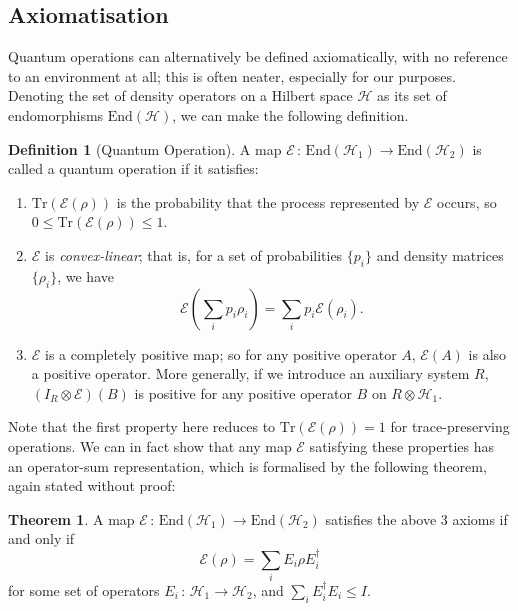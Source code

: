 \documentclass[12pt,a4paper]{report}
\numberwithin{equation}{section}
\newcommand{\tr}{\text{Tr}}
\theoremstyle{definition}
\newtheorem{definition}{Definition}[section]
\theoremstyle{theorem}
\newtheorem{theorem}{Theorem}[section]
\theoremstyle{theorem}
\theoremstyle{example}
\theoremstyle{definition}
\begin{document}
\subsection{Axiomatisation}
Quantum operations can alternatively be defined axiomatically, with no reference to an environment at all; this is often neater, especially for our purposes. Denoting the set of density operators on a Hilbert space $\mathcal{H}$ as its set of endomorphisms $\text{End}(\mathcal{H})$, we can make the following definition.
\begin{definition}[Quantum Operation]
	A map $\mathcal{E}\,:\,\text{End}(\mathcal{H}_{1})\to\text{End}(\mathcal{H}_{2})$ is called a quantum operation if it satisfies:
	\begin{enumerate}
		\item $\text{Tr}(\mathcal{E}(\rho))$ is the probability that the process represented by $\mathcal{E}$ occurs, so $0\leq\text{Tr}(\mathcal{E}(\rho))\leq 1$.
		\item $\mathcal{E}$ is \textit{convex-linear}; that is, for a set of probabilities $\{p_{i}\}$ and density matrices $\{\rho_{i}\}$, we have
		\begin{equation}
			\mathcal{E}\left(\sum_{i}p_{i}\rho_{i}\right)=\sum_{i}p_{i}\mathcal{E}(\rho_{i}).
		\end{equation}
		\item $\mathcal{E}$ is a completely positive map; so for any positive operator $A$, $\mathcal{E}(A)$ is also a positive operator. More generally, if we introduce an auxiliary system $R$, $(I_{R}\otimes \mathcal{E})(B)$ is positive for any positive operator $B$ on $R\otimes\mathcal{H}_{1}$.
	\end{enumerate} 
\end{definition}
Note that the first property here reduces to $\tr(\mathcal{E}(\rho))=1$ for trace-preserving operations. We can in fact show that any map $\mathcal{E}$ satisfying these properties has an operator-sum representation, which is formalised by the following theorem, again stated without proof:
\begin{theorem}
	A map $\mathcal{E}\,:\,\text{End}(\mathcal{H}_{1})\to\text{End}(\mathcal{H}_{2})$ satisfies the above 3 axioms if and only if
	\begin{equation}
		\mathcal{E}(\rho)=\sum_{i}E_{i}\rho E_{i}^{\dagger}
	\end{equation}
	for some set of operators $E_{i}\,:\,\mathcal{H}_{1}\to\mathcal{H}_{2}$, and $\sum_{i}E_{i}^{\dagger}E_{i}\leq I$.
\end{theorem}
\end{document}
